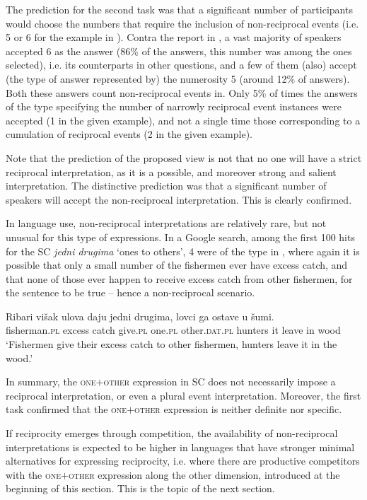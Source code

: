 \documentclass[output=paper,colorlinks,citecolor=brown]{langscibook}
\begin{document}
The prediction for the second task was that a significant number of participants would choose the numbers that require the inclusion of non-reciprocal events (i.e. 5 or 6 for the example in ). Contra the report in \citet{d08}, a vast majority of speakers accepted 6 as the answer (86\% of the answers, this number was among the ones selected), i.e. its counterparts in other questions, and a few of them (also) accept (the type of answer represented by) the
numerosity 5 (around 12\% of answers). Both these answers count non-reciprocal events in. Only 5\% of times the answers of the type specifying the number of narrowly reciprocal event instances were accepted (1 in the given example), and not a single time those corresponding to a cumulation of reciprocal events (2 in the given example). 

Note that the prediction of the proposed view is not that no one will have a strict reciprocal interpretation, as it is a possible, and moreover strong and salient interpretation. The distinctive prediction was that a significant number of speakers will accept the non-reciprocal interpretation. This is clearly confirmed.

In language use, non-reciprocal interpretations are relatively rare, but not unusual for this type of expressions. In a Google search, among the first 100 hits for the SC \textit{jedni drugima} `ones to others', 4 were of the type in , where again it is possible that only a small number of the fishermen ever have excess catch, and that none of those ever happen to receive excess catch from other fishermen, for the sentence to be true -- hence a non-reciprocal scenario.

\ea\label{ex:arsenijevic:Ribari} \gll Ribari višak ulova daju jedni drugima, lovci ga ostave u šumi.\\
 fisherman.\textsc{pl} excess catch give.\textsc{pl} one.\textsc{pl} other.\textsc{dat.\textsc{pl}} hunters it leave in wood\\
 \glt `Fishermen give their excess catch to other fishermen, hunters leave it in the wood.'
 \z

\largerpage
\noindent In summary, the \textsc{one$+$other} expression in SC does not necessarily impose a reciprocal interpretation, or even a plural event interpretation. Moreover, the first task confirmed that the \textsc{one$+$other} expression is neither definite nor specific. 

If reciprocity emerges through competition, the availability of non-reciprocal interpretations is expected to be higher in languages that have stronger minimal alternatives for expressing reciprocity, i.e. where there are productive competitors with the \textsc{one$+$other} expression along the other dimension, introduced at the beginning of this section. This is the topic of the next section.
\end{document}
